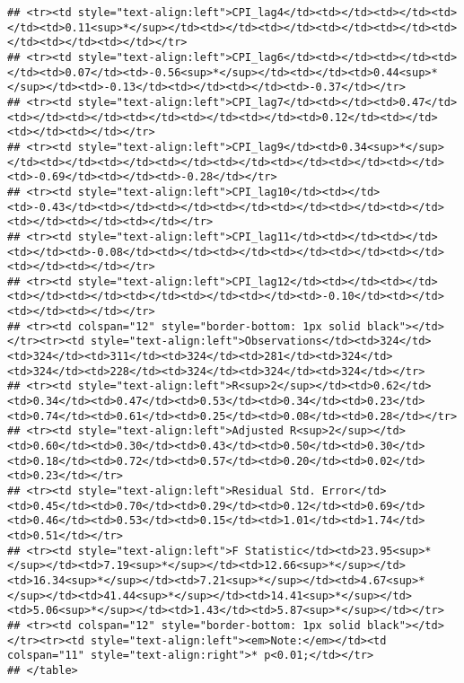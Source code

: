 \documentclass[
]{article}
\begin{document}
\begin{verbatim}
## <tr><td style="text-align:left">CPI_lag4</td><td></td><td></td><td></td><td>0.11<sup>*</sup></td><td></td><td></td><td></td><td></td><td></td><td></td><td></td></tr>
## <tr><td style="text-align:left">CPI_lag6</td><td></td><td></td><td></td><td>0.07</td><td>-0.56<sup>*</sup></td><td></td><td>0.44<sup>*</sup></td><td>-0.13</td><td></td><td></td><td>-0.37</td></tr>
## <tr><td style="text-align:left">CPI_lag7</td><td></td><td>0.47</td><td></td><td></td><td></td><td></td><td></td><td>0.12</td><td></td><td></td><td></td></tr>
## <tr><td style="text-align:left">CPI_lag9</td><td>0.34<sup>*</sup></td><td></td><td></td><td></td><td></td><td></td><td></td><td></td><td>-0.69</td><td></td><td>-0.28</td></tr>
## <tr><td style="text-align:left">CPI_lag10</td><td></td><td>-0.43</td><td></td><td></td><td></td><td></td><td></td><td></td><td></td><td></td><td></td></tr>
## <tr><td style="text-align:left">CPI_lag11</td><td></td><td></td><td></td><td>-0.08</td><td></td><td></td><td></td><td></td><td></td><td></td><td></td></tr>
## <tr><td style="text-align:left">CPI_lag12</td><td></td><td></td><td></td><td></td><td></td><td></td><td></td><td>-0.10</td><td></td><td></td><td></td></tr>
## <tr><td colspan="12" style="border-bottom: 1px solid black"></td></tr><tr><td style="text-align:left">Observations</td><td>324</td><td>324</td><td>311</td><td>324</td><td>281</td><td>324</td><td>324</td><td>228</td><td>324</td><td>324</td><td>324</td></tr>
## <tr><td style="text-align:left">R<sup>2</sup></td><td>0.62</td><td>0.34</td><td>0.47</td><td>0.53</td><td>0.34</td><td>0.23</td><td>0.74</td><td>0.61</td><td>0.25</td><td>0.08</td><td>0.28</td></tr>
## <tr><td style="text-align:left">Adjusted R<sup>2</sup></td><td>0.60</td><td>0.30</td><td>0.43</td><td>0.50</td><td>0.30</td><td>0.18</td><td>0.72</td><td>0.57</td><td>0.20</td><td>0.02</td><td>0.23</td></tr>
## <tr><td style="text-align:left">Residual Std. Error</td><td>0.45</td><td>0.70</td><td>0.29</td><td>0.12</td><td>0.69</td><td>0.46</td><td>0.53</td><td>0.15</td><td>1.01</td><td>1.74</td><td>0.51</td></tr>
## <tr><td style="text-align:left">F Statistic</td><td>23.95<sup>*</sup></td><td>7.19<sup>*</sup></td><td>12.66<sup>*</sup></td><td>16.34<sup>*</sup></td><td>7.21<sup>*</sup></td><td>4.67<sup>*</sup></td><td>41.44<sup>*</sup></td><td>14.41<sup>*</sup></td><td>5.06<sup>*</sup></td><td>1.43</td><td>5.87<sup>*</sup></td></tr>
## <tr><td colspan="12" style="border-bottom: 1px solid black"></td></tr><tr><td style="text-align:left"><em>Note:</em></td><td colspan="11" style="text-align:right">* p<0.01;</td></tr>
## </table>
\end{verbatim}
\end{document}
